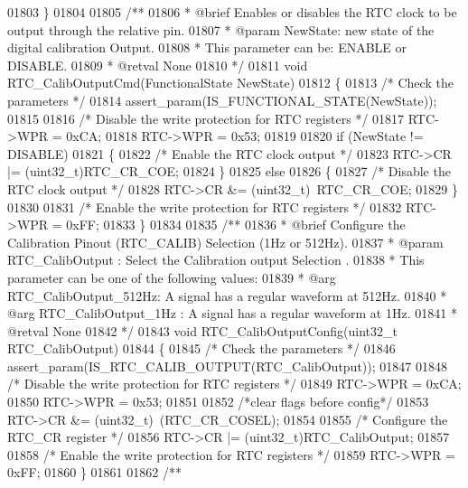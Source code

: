 \begin{DoxyCode}
01803 \}
01804 
01805 \textcolor{comment}{/**}
01806 \textcolor{comment}{  * @brief  Enables or disables the RTC clock to be output through the relative pin.}
01807 \textcolor{comment}{  * @param  NewState: new state of the digital calibration Output.}
01808 \textcolor{comment}{  *          This parameter can be: ENABLE or DISABLE.}
01809 \textcolor{comment}{  * @retval None}
01810 \textcolor{comment}{  */}
01811 \textcolor{keywordtype}{void} RTC_CalibOutputCmd(FunctionalState NewState)
01812 \{
01813   \textcolor{comment}{/* Check the parameters */}
01814   assert_param(IS\_FUNCTIONAL\_STATE(NewState));
01815 
01816   \textcolor{comment}{/* Disable the write protection for RTC registers */}
01817   RTC->WPR = 0xCA;
01818   RTC->WPR = 0x53;
01819 
01820   \textcolor{keywordflow}{if} (NewState != DISABLE)
01821   \{
01822     \textcolor{comment}{/* Enable the RTC clock output */}
01823     RTC->CR |= (uint32\_t)RTC_CR_COE;
01824   \}
01825   \textcolor{keywordflow}{else}
01826   \{
01827     \textcolor{comment}{/* Disable the RTC clock output */}
01828     RTC->CR &= (uint32\_t)~RTC_CR_COE;
01829   \}
01830 
01831   \textcolor{comment}{/* Enable the write protection for RTC registers */}
01832   RTC->WPR = 0xFF;
01833 \}
01834 
01835 \textcolor{comment}{/**}
01836 \textcolor{comment}{  * @brief  Configure the Calibration Pinout (RTC\_CALIB) Selection (1Hz or 512Hz).}
01837 \textcolor{comment}{  * @param  RTC\_CalibOutput : Select the Calibration output Selection .}
01838 \textcolor{comment}{  *   This parameter can be one of the following values:}
01839 \textcolor{comment}{  *     @arg RTC\_CalibOutput\_512Hz: A signal has a regular waveform at 512Hz. }
01840 \textcolor{comment}{  *     @arg RTC\_CalibOutput\_1Hz  : A signal has a regular waveform at 1Hz.}
01841 \textcolor{comment}{  * @retval None}
01842 \textcolor{comment}{*/}
01843 \textcolor{keywordtype}{void} RTC_CalibOutputConfig(uint32\_t RTC\_CalibOutput)
01844 \{
01845   \textcolor{comment}{/* Check the parameters */}
01846   assert_param(IS\_RTC\_CALIB\_OUTPUT(RTC\_CalibOutput));
01847 
01848   \textcolor{comment}{/* Disable the write protection for RTC registers */}
01849   RTC->WPR = 0xCA;
01850   RTC->WPR = 0x53;
01851 
01852   \textcolor{comment}{/*clear flags before config*/}
01853   RTC->CR &= (uint32\_t)~(RTC_CR_COSEL);
01854 
01855   \textcolor{comment}{/* Configure the RTC\_CR register */}
01856   RTC->CR |= (uint32\_t)RTC\_CalibOutput;
01857 
01858   \textcolor{comment}{/* Enable the write protection for RTC registers */}
01859   RTC->WPR = 0xFF;
01860 \}
01861 
01862 \textcolor{comment}{/**}

\end{DoxyCode}
